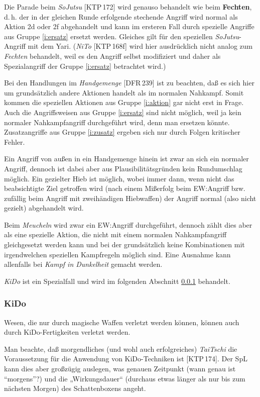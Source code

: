 \documentclass[10pt,a4paper,germanpar]{article}
\begin{document}
Die Parade beim \emph{SoJutsu} [KTP\,172] wird genauso behandelt wie beim
\textbf{Fechten}, d.\,h. der in der gleichen Runde erfolgende
stechende Angriff wird normal als Aktion 2d oder 2f abgehandelt und
kann im ersteren Fall durch spezielle Angriffe aus Gruppe
\ref{i:ersatz} ersetzt werden. Gleiches gilt für den speziellen
\emph{SoJutsu}-Angriff mit dem Yari. (\emph{NiTo} [KTP\,168f] wird
hier ausdrücklich nicht analog zum \emph{Fechten} behandelt, weil es
den Angriff selbst modifiziert und daher als Spezialangriff der Gruppe
\ref{i:ersatz} betrachtet wird.)

Bei den Handlungen im \emph{Handgemenge} [DFR\,239] ist zu beachten,
daß es sich hier um grundsätzlich andere Aktionen handelt als im
normalen Nahkampf. Somit kommen die speziellen Aktionen aus Gruppe
\ref{i:aktion} gar nicht erst in Frage. Auch die Angriffsweisen aus
Gruppe \ref{i:ersatz} sind nicht möglich, weil ja kein normaler
Nahkampfangriff durchgeführt wird, denn man ersetzen
könnte. Zusatzangriffe aus Gruppe \ref{i:zusatz} ergeben sich nur
durch Folgen kritischer Fehler.

Ein Angriff von außen in ein Handgemenge hinein ist zwar an sich ein
normaler Angriff, dennoch ist dabei aber aus Plausibilitätsgründen
kein Rundumschlag möglich. Ein gezielter Hieb ist möglich, wobei immer
dann, wenn nicht das beabsichtigte Ziel getroffen wird (nach einem
Mißerfolg beim EW:Angriff bzw. zufällig beim Angriff mit zweihändigen
Hiebwaffen) der Angriff normal (also nicht gezielt) abgehandelt wird.

Beim \emph{Meucheln} wird zwar ein EW:Angriff durchgeführt, dennoch
zählt dies aber als eine spezielle Aktion, die nicht mit einem
normalen Nahkampfangriff gleichgesetzt werden kann und bei der
grundsätzlich keine Kombinationen mit irgendwelchen speziellen
Kampfregeln möglich sind. Eine Ausnahme kann allenfalls bei
\emph{Kampf in Dunkelheit} gemacht werden.

\emph{KiDo} ist ein Spezialfall und wird im folgenden Abschnitt
\ref{kido} behandelt.

\subsubsection{KiDo}
\label{kido}

Wesen, die nur durch magische Waffen verletzt werden können, können
auch durch KiDo-Fertigkeiten verletzt werden.

Man beachte, daß morgendliches (und wohl auch erfolgreiches)
\emph{TaiTschi} die Voraussetzung für die Anwendung von KiDo-Techniken
ist [KTP\,174]. Der SpL kann dies aber großzügig auslegen, was genauen
Zeitpunkt (wann genau ist "`morgens"'?) und die „Wirkungsdauer“
(durchaus etwas länger als nur bis zum nächsten Morgen) des
Schattenboxens angeht.
\end{document}
